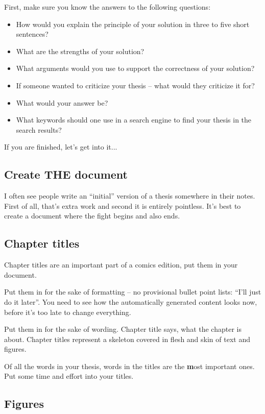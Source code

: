 First, make sure you know the answers to the following questions:
\begin{itemize}
  \item{How would you explain the principle of your solution in three to five short sentences?}
  \item{What are the strengths of your solution?}
  \item{What arguments would you use to support the correctness of your solution?}
  \item{If someone wanted to criticize your thesis -- what would they criticize it for?}
  \item{What would your answer be?}
  \item{What keywords should one use in a search engine to find your thesis in the search results?}
\end{itemize}

If you are finished, let's get into it...

\subsection*{Create THE document}

I often see people write an ``initial'' version of a thesis somewhere in their notes. First of all, that's extra work and second it is entirely pointless. It's best to create a document where the fight begins and also ends.

\subsection*{Chapter titles}

Chapter titles are an important part of a comics edition, put them in your document.

Put them in for the sake of formatting -- no provisional bullet point lists: ``I'll just do it later''. You need to see how the automatically generated content looks now, before it's too late to change everything.

Put them in for the sake of wording. Chapter title says, what the chapter is about. Chapter titles represent a skeleton covered in flesh and skin of text and figures.

Of all the words in your thesis, words in the titles are the \textbf most important ones\rm. Put some time and effort into your titles.

\subsection*{Figures}

